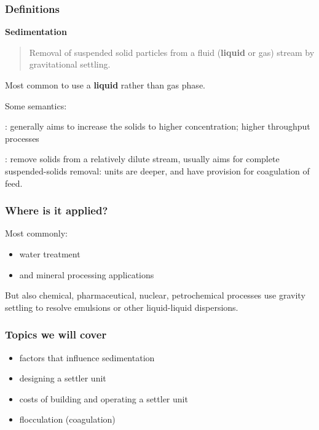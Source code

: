 \begin{frame}\frametitle{Definitions}
	
	\textbf{Sedimentation}
	\begin{quote}	
		Removal of suspended solid particles from a fluid (\textbf{liquid} or gas) stream by gravitational settling.
	\end{quote}
	Most common to use a \textbf{liquid} rather than gas phase.

	\vspace{12pt}
	Some semantics:
	
	\vspace{12pt}	
	{\color{myGreen}{Thickening}}: generally aims to increase the solids to higher concentration; higher throughput processes

	\vspace{12pt}
	{\color{myGreen}{Clarification}}: remove solids from a relatively dilute stream, usually aims for complete suspended-solids removal: units are deeper, and have provision for coagulation of feed.
	
	
\end{frame}

\begin{frame}\frametitle{Where is it applied?}	
	Most commonly:
	\begin{itemize}
		\item	water treatment
		\item	and mineral processing applications
	\end{itemize}
	
	\vspace{12pt}
	But also chemical, pharmaceutical, nuclear, petrochemical processes use gravity settling to resolve emulsions or other liquid-liquid dispersions. 	
\end{frame}

\begin{frame}\frametitle{Topics we will cover}
	\begin{itemize}
		\item	factors that influence sedimentation
		\item	designing a settler unit
		\item	costs of building and operating a settler unit
		\item	flocculation (coagulation)
	\end{itemize}
\end{frame}

